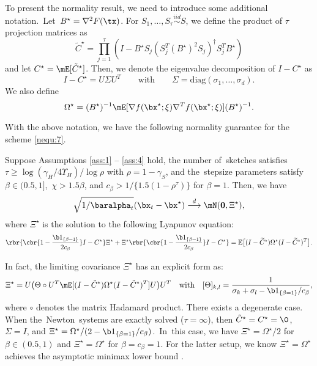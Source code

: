 To present the normality result, we need to introduce some additional notation.~Let~\mbox{$B^\star = \nabla^2F(\tx)$}. For $S_1,\ldots,S_\tau\stackrel{iid}{\sim}S$, we define the product of $\tau$ projection matrices as
\begin{equation}\label{exp:Cstar}
\tilde{C}^\star = \prod_{j=1}^\tau(I - B^\star S_j(S_j^T(B^\star)^2S_j)^\dagger S_j^TB^\star)
\end{equation}
and let $C^\star=\mE[\tilde{C}^\star]$. Then, we denote the eigenvalue decomposition of $I-C^\star$ as
\begin{equation}\label{eigendecomp}
I-C^\star = U\Sigma U^T\quad\quad\text{with}\quad\quad \Sigma=\text{diag}(\sigma_1,\dots,\sigma_d).
\end{equation}
We also define
\begin{equation}\label{exp:Omegastar}
\Omega^\star = (B^\star)^{-1}\mE[\nabla f(\bx^\star;\xi)\nabla^T f(\bx^\star;\xi)](B^\star)^{-1}.
\end{equation} 

With the above notation, we have the following normality guarantee for the scheme \eqref{nequ:7}.


\begin{theorem}\label{sec3:thm2}

Suppose Assumptions \ref{ass:1} -- \ref{ass:4} hold, the number of~sketches satisfies $\tau\geq \log(\gamma_H/4\Upsilon_H)/\log \rho$ with $\rho = 1-\gamma_S$, and the~stepsize parameters satisfy~$\beta\in(0.5,1]$,~$\chi>1.5\beta$, and $c_{\beta}>1/\{1.5(1-\rho^\tau)\}$ for $\beta=1$. Then, we have 
\begin{equation*}
\sqrt{1/\baralpha_t}(\bx_t-\bx^\star)\stackrel{d}{\longrightarrow}\mN(\mathbf{0},\Xi^\star),
\end{equation*}
where $\Xi^{\star}$ is the solution to the following Lyapunov equation:
\begin{equation}\label{equ:lyap}
\rbr{\cbr{1 - \frac{\b1_{\{\beta=1\}}}{2c_\beta} }I - C^\star}\Xi^{\star} + \Xi^{\star}\rbr{\cbr{1 - \frac{\b1_{\{\beta=1\}}}{2c_\beta}}I - C^\star} = \mathbb{E}\big[(I-\widetilde{C}^{\star}) \Omega^{\star}(I-\widetilde{C}^{\star})^T\big].
\end{equation}
\end{theorem}


In fact, the limiting covariance $\Xi^{\star}$ has an explicit form as:
\begin{equation}\label{exp:Xistar}
\Xi^\star = U\big(\Theta\circ U^T\mE[(I-\tilde{C}^*)\Omega^\star(I-\tilde{C}^*)^T]U\big)U^T\quad\text{with}\quad [\Theta]_{k,l}= \frac{1}{\sigma_k + \sigma_l - \b1_{\{\beta=1\}}/c_\beta},
\end{equation}
where $\circ$ denotes the matrix Hadamard product. There exists a degenerate case. When the~Newton~systems are exactly solved ($\tau=\infty$), then $\tilde{C}^\star = C^\star = \0$, $\Sigma=I$, and $\Xi^\star = \Omega^\star/(2- \b1_{\{\beta=1\}}/c_\beta)$.~In~this case, we have $\Xi^\star = \Omega^\star/2$ for $\beta\in(0.5,1)$ and $\Xi^\star = \Omega^\star$ for $\beta=c_{\beta}=1$. For the latter setup, we know $\Xi^\star = \Omega^\star$ achieves the asymptotic minimax lower bound \citep{Duchi2021Asymptotic}.




